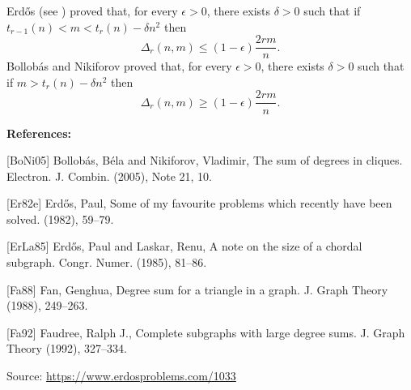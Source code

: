\documentclass{article}
\begin{document}
Erd\H{o}s (see \cite{Fa92}) proved that, for every $\epsilon>0$, there exists $\delta>0$ such that if $t_{r-1}(n)<m<t_r(n)-\delta n^2$ then\[\Delta_r(n,m)\leq (1-\epsilon)\frac{2rm}{n}.\]Bollob\'{a}s and Nikiforov \cite{BoNi05} proved that, for every $\epsilon>0$, there exists $\delta>0$ such that if $m>t_r(n)-\delta n^2$ then\[\Delta_r(n,m)\geq (1-\epsilon)\frac{2rm}{n}.\]

\bigskip
\noindent\textbf{References:}

[BoNi05] Bollob\'{a}s, B\'ela and Nikiforov, Vladimir, The sum of degrees in cliques. Electron. J. Combin. (2005), Note 21, 10.
 
 [Er82e] Erd\H{o}s, Paul, Some of my favourite problems which recently have been solved. (1982), 59--79.
 
 [ErLa85] Erd\H{o}s, Paul and Laskar, Renu, A note on the size of a chordal subgraph. Congr. Numer. (1985), 81--86.
 
 [Fa88] Fan, Genghua, Degree sum for a triangle in a graph. J. Graph Theory (1988), 249--263.
 
 [Fa92] Faudree, Ralph J., Complete subgraphs with large degree sums. J. Graph Theory (1992), 327--334.

\bigskip
\noindent\small{Source: \url{https://www.erdosproblems.com/1033}}
\end{document}
